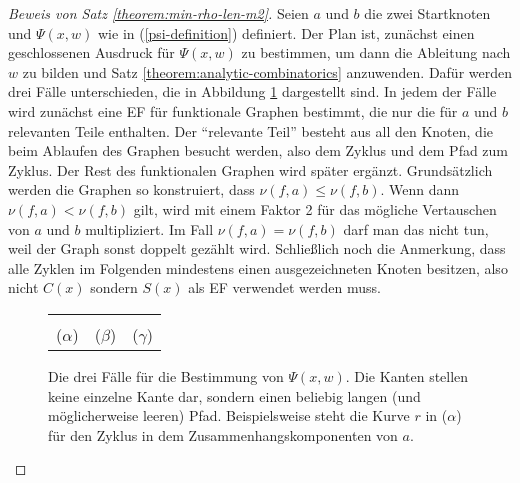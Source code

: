 \documentclass[a4paper, 10pt, ngerman]{article}
\begin{document}
\begin{proof}[Beweis von Satz \ref{theorem:min-rho-len-m2}]
    Seien $a$ und $b$ die zwei Startknoten und $\Psi(x, w)$ wie in (\ref{psi-definition}) definiert. Der Plan ist, zunächst einen geschlossenen Ausdruck für $\Psi(x, w)$ zu bestimmen, um dann die Ableitung nach $w$ zu bilden und Satz \ref{theorem:analytic-combinatorics} anzuwenden. Dafür werden drei Fälle unterschieden, die in Abbildung \ref{fig:psi-construction} dargestellt sind. In jedem der Fälle wird zunächst eine EF für funktionale Graphen bestimmt, die nur die für $a$ und $b$ relevanten Teile enthalten. Der "`relevante Teil"' besteht aus all den Knoten, die beim Ablaufen des Graphen besucht werden, also dem Zyklus und dem Pfad zum Zyklus. Der Rest des funktionalen Graphen wird später ergänzt. Grundsätzlich werden die Graphen so konstruiert, dass $\nu(f, a) \le \nu(f, b)$. Wenn dann $\nu(f, a) < \nu(f, b)$ gilt, wird mit einem Faktor 2 für das mögliche Vertauschen von $a$ und $b$ multipliziert. Im Fall $\nu(f, a) = \nu(f, b)$ darf man das nicht tun, weil der Graph sonst doppelt gezählt wird. Schließlich noch die Anmerkung, dass alle Zyklen im Folgenden mindestens einen ausgezeichneten Knoten besitzen, also nicht $C(x)$ sondern $S(x)$ als EF verwendet werden muss.

    \begin{figure}
        \begin{tabular}{ccc}
             &  &  \\
            ($\alpha$)                           & ($\beta$)                           & ($\gamma$)
        \end{tabular}
        \caption{Die drei Fälle für die Bestimmung von $\Psi(x, w)$. Die Kanten stellen keine einzelne Kante dar, sondern einen beliebig langen (und möglicherweise leeren) Pfad. Beispielsweise steht die Kurve $r$ in ($\alpha$) für den Zyklus in dem Zusammenhangskomponenten von $a$.}
        \label{fig:psi-construction}
    \end{figure}


\end{proof}
\end{document}
